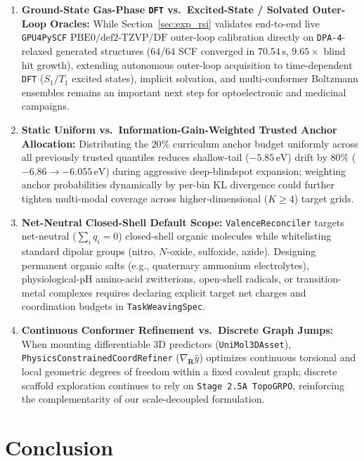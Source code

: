 \documentclass[11pt,a4paper]{article}
\begin{document}
\begin{enumerate}[leftmargin=1.6em,itemsep=2pt,topsep=2pt]
    \item \textbf{Ground-State Gas-Phase \texttt{DFT} vs.\ Excited-State / Solvated Outer-Loop Oracles:} While Section~\ref{sec:exp_rsi} validates end-to-end live \texttt{GPU4PySCF} \citep{li2024gpu4pyscf} $\text{PBE0/def2-TZVP/DF}$ outer-loop calibration directly on \texttt{DPA-4}-relaxed generated structures ($64/64$ SCF converged in $70.54\,\text{s}$, $9.65\times$ blind hit growth), extending autonomous outer-loop acquisition to time-dependent \texttt{DFT} ($S_1/T_1$ excited states), implicit solvation, and multi-conformer Boltzmann ensembles remains an important next step for optoelectronic and medicinal campaigns.
    \item \textbf{Static Uniform vs.\ Information-Gain-Weighted Trusted Anchor Allocation:} Distributing the $20\%$ curriculum anchor budget uniformly across all previously trusted quantiles reduces shallow-tail ($-5.85\,\text{eV}$) drift by $80\%$ ($-6.86 \to -6.055\,\text{eV}$) during aggressive deep-blindspot expansion; weighting anchor probabilities dynamically by per-bin KL divergence could further tighten multi-modal coverage across higher-dimensional ($K \ge 4$) target grids.
    \item \textbf{Net-Neutral Closed-Shell Default Scope:} \texttt{ValenceReconciler} targets net-neutral ($\sum_i q_i = 0$) closed-shell organic molecules while whitelisting standard dipolar groups (nitro, $N$-oxide, sulfoxide, azide). Designing permanent organic salts (e.g., quaternary ammonium electrolytes), physiological-pH amino-acid zwitterions, open-shell radicals, or transition-metal complexes requires declaring explicit target net charges and coordination budgets in \texttt{TaskWeavingSpec}.
    \item \textbf{Continuous Conformer Refinement vs.\ Discrete Graph Jumps:} When mounting differentiable 3D predictors (\texttt{UniMol3DAsset}), \texttt{PhysicsConstrainedCoordRefiner} ($\nabla_{\mathbf{R}}\hat{y}$) optimizes continuous torsional and local geometric degrees of freedom within a fixed covalent graph; discrete scaffold exploration continues to rely on \texttt{Stage 2.5A TopoGRPO}, reinforcing the complementarity of our scale-decoupled formulation.
\end{enumerate}

\section{Conclusion}
\label{sec:conclusion}
\end{document}
